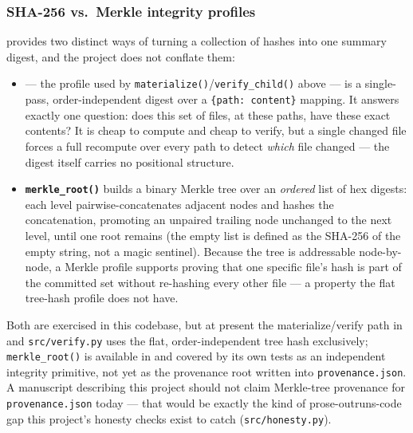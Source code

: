 \documentclass[
]{article}
\providecommand{\tightlist}{%
  \setlength{\itemsep}{0pt}\setlength{\parskip}{0pt}}
\begin{document}
\subsubsection{SHA-256 vs.~Merkle integrity
profiles}\label{sha-256-vs.-merkle-integrity-profiles}

 provides two distinct ways of turning a
collection of hashes into one summary digest, and the project does not
conflate them:

\begin{itemize}
\tightlist
\item
  \textbf{} --- the profile
  used by \texttt{materialize()}/\texttt{verify\_child()} above --- is a
  single-pass, order-independent digest over a
  \texttt{\{path:\ content\}} mapping. It answers exactly one question:
  does this set of files, at these paths, have these exact contents? It
  is cheap to compute and cheap to verify, but a single changed file
  forces a full recompute over every path to detect \emph{which} file
  changed --- the digest itself carries no positional structure.
\item
  \textbf{\texttt{merkle\_root()}} builds a binary Merkle tree
  \citep{merkle_tree_provenance} over an \emph{ordered} list of hex
  digests: each level pairwise-concatenates adjacent nodes and hashes
  the concatenation, promoting an unpaired trailing node unchanged to
  the next level, until one root remains (the empty list is defined as
  the SHA-256 of the empty string, not a magic sentinel). Because the
  tree is addressable node-by-node, a Merkle profile supports proving
  that one specific file's hash is part of the committed set without
  re-hashing every other file --- a property the flat tree-hash profile
  does not have.
\end{itemize}

Both are exercised in this codebase, but at present the
materialize/verify path in  and
\texttt{src/verify.py} uses the flat, order-independent tree hash
exclusively; \texttt{merkle\_root()} is available in
 and covered by its own tests as an independent
integrity primitive, not yet as the provenance root written into
\texttt{provenance.json}. A manuscript describing this project should
not claim Merkle-tree provenance for \texttt{provenance.json} today ---
that would be exactly the kind of prose-outruns-code gap this project's
honesty checks exist to catch (\texttt{src/honesty.py}).
\end{document}
